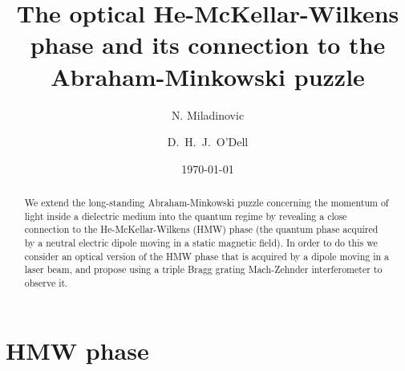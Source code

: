 \documentclass[twocolumn,english,pra,aps,superscriptaddress,floatfix]{revtex4-1}
\begin{document}
\author{N. Miladinovic}
\author{D.\ H.\ J.\ O'Dell}

\title{The optical He-McKellar-Wilkens phase and its connection to the Abraham-Minkowski puzzle}
\date{\today}

\begin{abstract}
\label{sec:abstract}
We extend the long-standing Abraham-Minkowski puzzle concerning the momentum of light inside a dielectric medium into the quantum regime by revealing a close connection to the He-McKellar-Wilkens (HMW) phase (the quantum phase acquired by a neutral electric dipole moving in a static magnetic field). In order to do this we consider an optical version of the HMW phase that is acquired by a dipole moving in a laser beam, and propose using a triple Bragg grating Mach-Zehnder interferometer to observe it. 



\end{abstract}

\maketitle

\section{HMW phase}
\label{sec:HMW}
\end{document}
